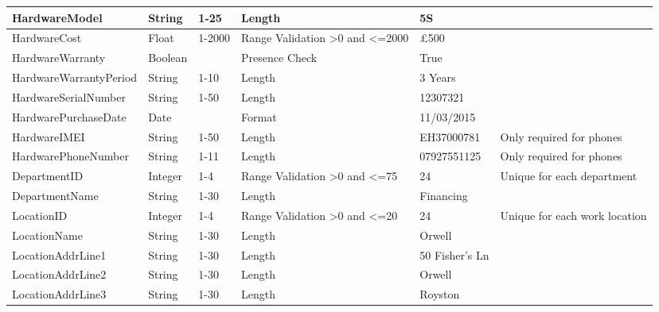 \begin{center}
\begin{longtable}{|p{4cm}|p{1.3cm}|p{1.1cm}|p{1.7cm}|p{1.7cm}|p{2cm}|}
HardwareModel                       & String                                  & 1-25                                 & Length                                   & 5S                    &                       \\ \hline
HardwareCost                       & Float                                 & 1-2000                             & Range Validation \textgreater0 and \textless=2000                                    & £500                  &                       \\ \hline
HardwareWarranty                    & Boolean                                 &                                      & Presence Check                           & True                  &                       \\ \hline
HardwareWarrantyPeriod              & String                                  & 1-10                                 & Length                                   & 3 Years               &                       \\ \hline
HardwareSerialNumber                & String                                  & 1-50                                 & Length                                   & 12307321              &                       \\ \hline
HardwarePurchaseDate                & Date                                  &                                  & Format                                   & 11/03/2015              &                       \\ \hline
HardwareIMEI                & String                                  &          1-50                        & Length                                   & EH37000781               & Only required for phones                      \\ \hline
HardwarePhoneNumber                & String                                  &1-11                                  & Length                                   & 07927551125              &   Only required for phones                      \\ \hline
DepartmentID &Integer				& 1-4				&Range Validation \textgreater0 and \textless=75		& 24		& Unique for each department	\\ \hline
DepartmentName & String				& 1-30				& Length		& Financing		&	\\ \hline
LocationID &Integer				& 1-4				&Range Validation \textgreater0 and \textless=20		& 	24	& Unique for each work location		\\ \hline
LocationName & String				& 1-30				& Length		&	Orwell	 &  \\ \hline
LocationAddrLine1 & String				& 1-30				& Length		&	50 Fisher's Ln	 &  \\ \hline
LocationAddrLine2 & String				& 1-30				& Length		&	Orwell	 &  \\ \hline
LocationAddrLine3  & String				& 1-30				& Length		&	Royston 	 &  \\ \hline
\end{longtable}
\end{center}

